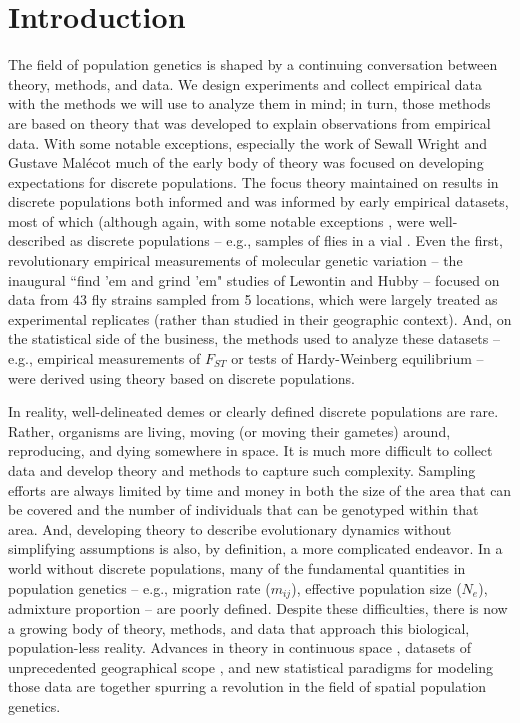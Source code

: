 \documentclass{ar-1col}
\begin{document}
\section{Introduction}

The field of population genetics is shaped by a continuing conversation
between theory, methods, and data.
We design experiments and collect empirical data
with the methods we will use to analyze them in mind;
in turn, those methods are based on theory
that was developed to explain observations from empirical data.
With some notable exceptions,
especially the work of Sewall Wright \citep{Wright1940,Wright1943,wright1946isolation}
and Gustave Mal\'ecot \citep{malecot}
much of the early body of theory was focused on
developing expectations for discrete populations.
The focus theory maintained on results in discrete populations
both informed and was informed by early empirical datasets,
most of which
(although again,
with some notable exceptions \citep[e.g.,][]{Dobzhansky_Wright1943, dobzhansky1947},
were well-described as discrete populations --
e.g., samples of flies in a vial \citep{lewontin1974}.
Even the first, revolutionary empirical measurements
of molecular genetic variation
-- the inaugural ``find 'em and grind 'em" studies of Lewontin and Hubby \citep{HubbyLewontin66,LewontinHubby66} --
focused on data from 43 fly strains sampled from 5 locations,
which were largely treated as experimental replicates
(rather than studied in their geographic context).
And, on the statistical side of the business,
the methods used to analyze these datasets --
e.g., empirical measurements of $F_{ST}$ \citep{Wright1951}
or tests of Hardy-Weinberg equilibrium \citep{hardy1908,weinberg1908} --
were derived using theory based on discrete populations.

In reality, well-delineated demes or clearly defined discrete populations are rare.
Rather, organisms are living,
moving (or moving their gametes) around,
reproducing, and dying somewhere in space.
It is much more difficult to collect data and develop theory and methods
to capture such complexity.
Sampling efforts are always limited by time and money
in both the size of the area that can be covered
and the number of individuals that can be genotyped within that area.
And, developing theory to describe evolutionary dynamics
without simplifying assumptions is also,
by definition,
a more complicated endeavor.
In a world without discrete populations, 
many of the fundamental quantities in population genetics -- 
e.g., migration rate ($m_{ij}$), 
effective population size ($N_e$),
admixture proportion
--
are poorly defined.
Despite these difficulties,
there is now a growing body of theory, methods, and data
that approach this biological, population-less reality.
Advances in theory in continuous space 
\citep{felsenstein1975pain,BartonWilson1995,barton-depaulis-etheridge, barton2010modelling, barton2010newmodel, Barton2013},
datasets of unprecedented geographical scope 
\citep[e.g.,][]{POBI, Aguillon2017deconstructing, Shaffer195743},
and new statistical paradigms for modeling those data 
\citep{petkova2016visualizing, ringbauer2017inferring, ringbauer2018estimating, conStruct, alasadi2018estimating}
are together spurring a revolution in the field of spatial population genetics.
\end{document}
